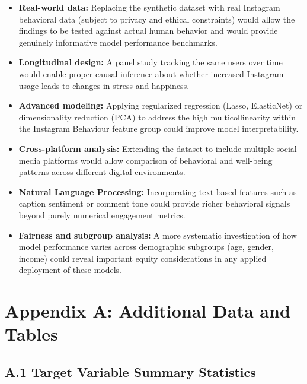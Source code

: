 \documentclass[12pt,a4paper]{article}
\begin{document}
\begin{itemize}
    \item \textbf{Real-world data:} Replacing the synthetic dataset with real Instagram behavioral data (subject to privacy and ethical constraints) would allow the findings to be tested against actual human behavior and would provide genuinely informative model performance benchmarks.
    
    \item \textbf{Longitudinal design:} A panel study tracking the same users over time would enable proper causal inference about whether increased Instagram usage leads to changes in stress and happiness.
    
    \item \textbf{Advanced modeling:} Applying regularized regression (Lasso, ElasticNet) or dimensionality reduction (PCA) to address the high multicollinearity within the Instagram Behaviour feature group could improve model interpretability.
    
    \item \textbf{Cross-platform analysis:} Extending the dataset to include multiple social media platforms would allow comparison of behavioral and well-being patterns across different digital environments.
    
    \item \textbf{Natural Language Processing:} Incorporating text-based features such as caption sentiment or comment tone could provide richer behavioral signals beyond purely numerical engagement metrics.
    
    \item \textbf{Fairness and subgroup analysis:} A more systematic investigation of how model performance varies across demographic subgroups (age, gender, income) could reveal important equity considerations in any applied deployment of these models.
\end{itemize}
 
\newpage



\newpage
\appendix
 
\section{Appendix A: Additional Data and Tables}
 
\subsection*{A.1 Target Variable Summary Statistics}
 
\end{document}

